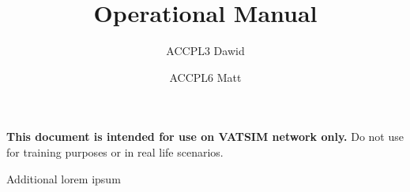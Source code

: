 \documentclass[revision=2309.1]{inop}
\title{Operational Manual}
\author{ACCPL3 Dawid\and ACCPL6 Matt}
\date{\revision}
\begin{document}
\maketitle
\begin{tcolorbox}[
    colback=white,
    colframe=vred,
    enhanced,
    before title={\faExclamationTriangle~},
    title=\LARGE\textbf{Disclaimer}
]
    \textbf{This document is intended for use on VATSIM network only.}
    \tcblower%
    Do not use for training purposes or in real life scenarios.
\end{tcolorbox}
\frontmatter%
\tableofcontents

\mainmatter%

\backmatter%
Additional lorem ipsum
\end{document}
